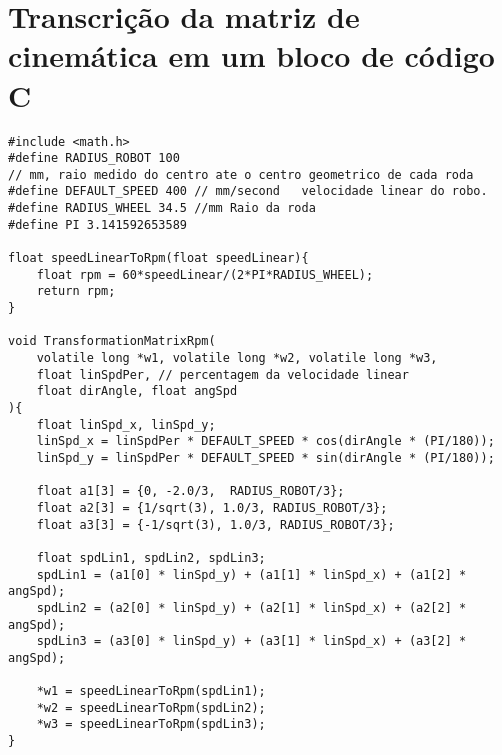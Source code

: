 

\chapter{Transcrição da matriz de cinemática em um bloco de código C \label{matriz_cinematica_c}}

\lstset{language=C}
\begin{lstlisting}
#include <math.h>
#define RADIUS_ROBOT 100
// mm, raio medido do centro ate o centro geometrico de cada roda
#define DEFAULT_SPEED 400 // mm/second   velocidade linear do robo.
#define RADIUS_WHEEL 34.5 //mm Raio da roda
#define PI 3.141592653589

float speedLinearToRpm(float speedLinear){
    float rpm = 60*speedLinear/(2*PI*RADIUS_WHEEL);
    return rpm;
}

void TransformationMatrixRpm(
	volatile long *w1, volatile long *w2, volatile long *w3,
	float linSpdPer, // percentagem da velocidade linear
	float dirAngle, float angSpd
){
	float linSpd_x, linSpd_y;
	linSpd_x = linSpdPer * DEFAULT_SPEED * cos(dirAngle * (PI/180));
	linSpd_y = linSpdPer * DEFAULT_SPEED * sin(dirAngle * (PI/180));

	float a1[3] = {0, -2.0/3,  RADIUS_ROBOT/3};
	float a2[3] = {1/sqrt(3), 1.0/3, RADIUS_ROBOT/3};
	float a3[3] = {-1/sqrt(3), 1.0/3, RADIUS_ROBOT/3};

	float spdLin1, spdLin2, spdLin3;
	spdLin1 = (a1[0] * linSpd_y) + (a1[1] * linSpd_x) + (a1[2] * angSpd);
	spdLin2 = (a2[0] * linSpd_y) + (a2[1] * linSpd_x) + (a2[2] * angSpd);
	spdLin3 = (a3[0] * linSpd_y) + (a3[1] * linSpd_x) + (a3[2] * angSpd);
	
	*w1 = speedLinearToRpm(spdLin1);
	*w2 = speedLinearToRpm(spdLin2);
	*w3 = speedLinearToRpm(spdLin3);	
}
\end{lstlisting}